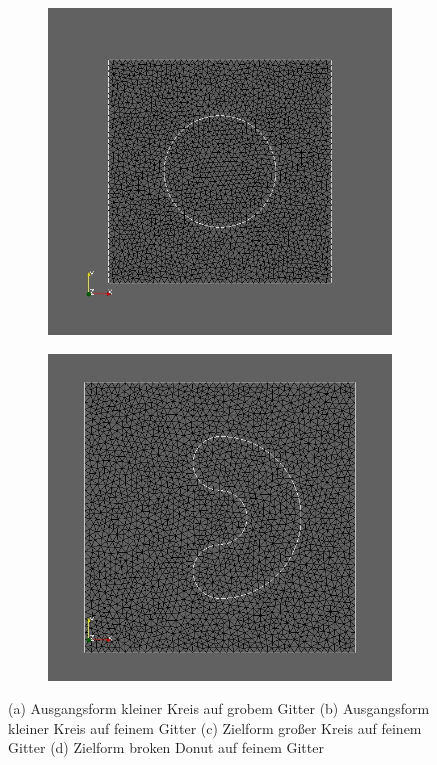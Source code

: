 \documentclass[bibliography=totoc,12pt,a4paper]{scrartcl}
\theoremstyle{exampstyle}
\numberwithin{equation}{section}
\begin{document}
\begin{figure}
\begin{subfigure}{0.5\textwidth}
	\caption{}	
	\end{subfigure}
	\begin{subfigure}{0.5\textwidth}
	\centering
	\includegraphics[scale=0.25]{pic_bigcircle_fine.jpg}
	\caption{}	
	\end{subfigure}
	\begin{subfigure}{0.5\textwidth}
	\centering
	\includegraphics[scale=0.25]{pic_brokendonut_fine.jpg}
	\caption{}	
	\end{subfigure}
\caption{(a) Ausgangsform kleiner Kreis auf grobem Gitter (b) Ausgangsform kleiner Kreis auf feinem Gitter (c) Zielform großer Kreis auf feinem Gitter (d) Zielform broken Donut auf feinem Gitter}
\label{Meshes}
\end{figure}
\end{document}
